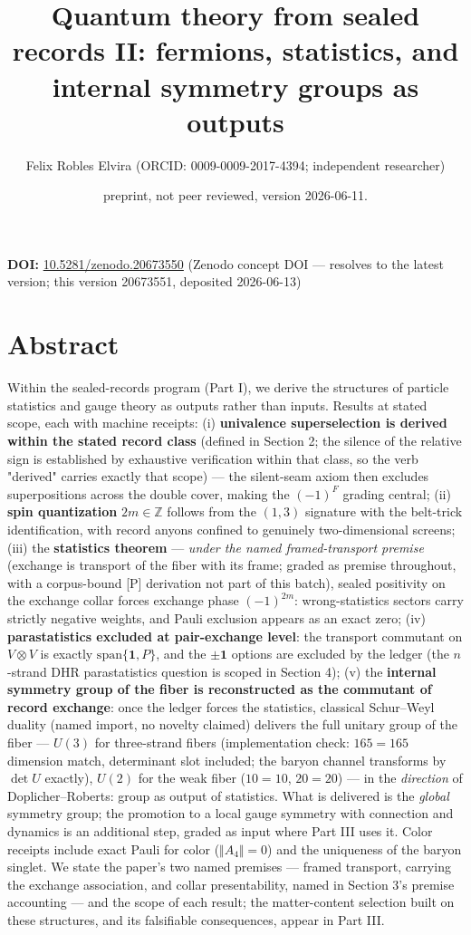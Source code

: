\documentclass[11pt]{article}
\title{Quantum theory from sealed records II: fermions, statistics, and internal symmetry groups as outputs}
\author{Felix Robles Elvira (ORCID: 0009-0009-2017-4394; independent researcher)}
\date{\small preprint, not peer reviewed, version 2026-06-11.}
\begin{document}
\maketitle

\textbf{DOI:} \href{https://doi.org/10.5281/zenodo.20673550}{10.5281/zenodo.20673550} (Zenodo concept DOI — resolves to the latest version; this version 20673551, deposited 2026-06-13)

\section*{Abstract}
Within the sealed-records program (Part I), we derive the structures of particle statistics and gauge theory as outputs rather than inputs.  Results at stated scope, each with machine receipts: (i) \textbf{univalence superselection is derived within the stated record class} (defined in Section 2; the silence of the relative sign is established by exhaustive verification within that class, so the verb "derived" carries exactly that scope) — the silent-seam axiom then excludes superpositions across the double cover, making the $(-1)^F$ grading central; (ii) \textbf{spin quantization} $2m \in \mathbb Z$ follows from the $(1,3)$ signature with the belt-trick identification, with record anyons confined to genuinely two-dimensional screens; (iii) the \textbf{statistics theorem} — \emph{under the named framed-transport premise} (exchange is transport of the fiber with its frame; graded as premise throughout, with a corpus-bound [P] derivation not part of this batch), sealed positivity on the exchange collar forces exchange phase $(-1)^{2m}$: wrong-statistics sectors carry strictly negative weights, and Pauli exclusion appears as an exact zero; (iv) \textbf{parastatistics excluded at pair-exchange level}: the transport commutant on $V \otimes V$ is exactly $\mathrm{span}\{\mathbf 1, P\}$, and the $\pm\mathbf 1$ options are excluded by the ledger (the $n$-strand DHR parastatistics question is scoped in Section 4); (v) the \textbf{internal symmetry group of the fiber is reconstructed as the commutant of record exchange}: once the ledger forces the statistics, classical Schur–Weyl duality (named import, no novelty claimed) delivers the full unitary group of the fiber — $U(3)$ for three-strand fibers (implementation check: $165 = 165$ dimension match, determinant slot included; the baryon channel transforms by $\det U$ exactly), $U(2)$ for the weak fiber ($10 = 10$, $20 = 20$) — in the \emph{direction} of Doplicher–Roberts: group as output of statistics.  What is delivered is the \emph{global} symmetry group; the promotion to a local gauge symmetry with connection and dynamics is an additional step, graded as input where Part III uses it.  Color receipts include exact Pauli for color ($\Vert A_4\Vert = 0$) and the uniqueness of the baryon singlet.  We state the paper's two named premises — framed transport, carrying the exchange association, and collar presentability, named in Section 3's premise accounting — and the scope of each result; the matter-content selection built on these structures, and its falsifiable consequences, appear in Part III.
\end{document}
